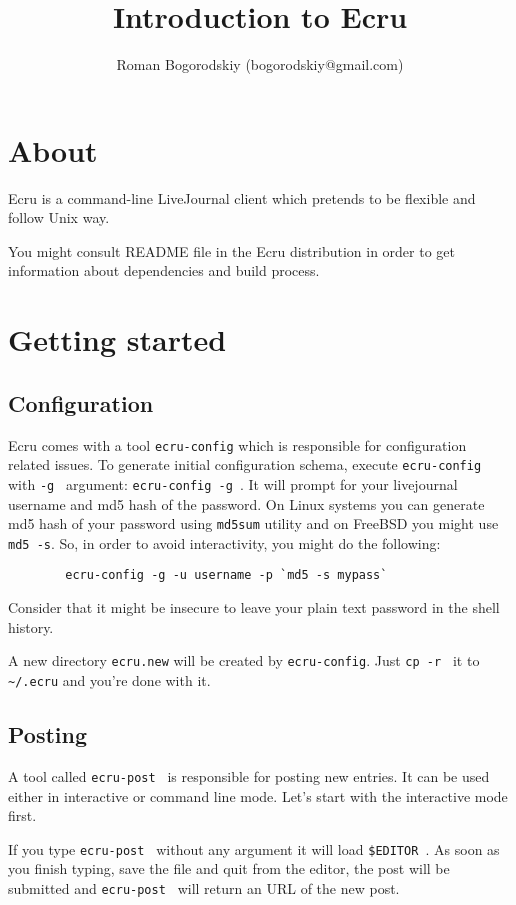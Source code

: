 \documentclass{article}
\title{Introduction to Ecru}
\author{Roman Bogorodskiy (bogorodskiy@gmail.com)}
\date{}
\begin{document}
   \maketitle
   \section{About}
    Ecru is a command-line LiveJournal client which pretends to be flexible
    and follow Unix way.
 
    You might consult README file in the Ecru distribution in order to get
    information about dependencies and build process.

    \section{Getting started}
      \subsection{Configuration}
       Ecru comes with a tool {\tt ecru-config} which is responsible for
       configuration related issues. To generate initial configuration schema,
       execute {\tt ecru-config } with {\tt -g } argument: { \tt ecru-config -g }. It
       will prompt for your livejournal username and md5 hash of the password.
       On Linux systems you can generate md5 hash of your password using
       {\tt md5sum} utility and on FreeBSD you might use {\tt md5 -s}. So, in order
       to avoid interactivity, you might do the following:
  
	\begin{verbatim}
		ecru-config -g -u username -p `md5 -s mypass`
	\end{verbatim}
	
	Consider that it might be insecure to leave your plain text password in the
	shell history.

	A new directory {\tt ecru.new} will be created by {\tt ecru-config}. Just 
	{\tt cp -r } it to {\tt \verb+~+/.ecru} and you're done with it.
       \subsection{Posting}
	A tool called {\tt ecru-post } is responsible for posting new entries. It can be used
	either in interactive or command line mode. Let's start with the interactive mode first.

	If you type {\tt ecru-post } without any argument it will load {\tt \$EDITOR }. As soon as you
	finish typing, save the file and quit from the editor, the post will be submitted and
	{\tt ecru-post } will return an URL of the new post.
\end{document}
